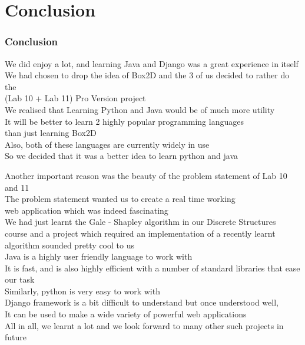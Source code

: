 \section{Conclusion}
\begin{frame}
	\frametitle{Conclusion}
	We did enjoy a lot, and learning Java and Django was a great experience in itself \pause \\
	We had chosen to drop the idea of Box2D and the 3 of us decided to rather do the \pause \\
	(Lab 10 + Lab 11) Pro Version project \pause \\
	We realised that Learning Python and Java would be of much more utility \pause \\
	It will be better to learn 2 highly popular programming languages \pause \\
	than just learning Box2D \pause \\
	Also, both of these languages are currently widely in use \pause \\
	So we decided that it was a better idea to learn python and java \pause \\
\end{frame}
\begin{frame}
	Another important reason was the beauty of the problem statement of Lab 10 and 11 \pause \\
	The problem statement wanted us to create a real time working \pause \\
	web application which was indeed fascinating \pause \\
	We had just learnt the Gale - Shapley algorithm in our Discrete Structures \pause \\
	course and a project which required an implementation of a recently learnt \pause \\
	algorithm sounded pretty cool to us \pause \\
	Java is a highly user friendly language to work with \pause \\
	It is fast, and is also highly efficient with a number of standard libraries that ease our task \pause \\
	Similarly, python is very easy to work with  \pause \\
	Django framework is a bit difficult to understand but once understood well,  \pause \\
	It can be used to make a wide variety of powerful web applications \pause \\
	All in all, we learnt a lot and we look forward to many other such projects in future \pause \\

\end{frame}

